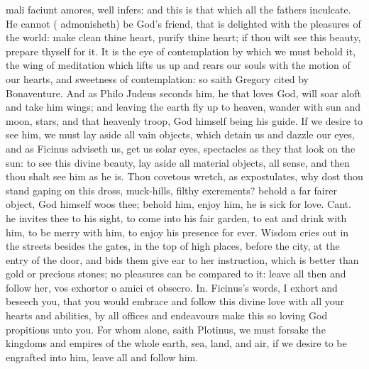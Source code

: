 {mali faciunt amores, \Austin{} well infers: and this is that which all the
fathers inculcate. He cannot (\Austin{} admonisheth) be God's
friend, that is delighted with the pleasures of the world: make clean
thine heart, purify thine heart; if thou wilt see this beauty, prepare
thyself for it. It is the eye of contemplation by which we must behold
it, the wing of meditation which lifts us up and rears our souls with
the motion of our hearts, and sweetness of contemplation: so saith
Gregory cited by Bonaventure. And as Philo Judeus seconds
him, he that loves God, will soar aloft and take him wings; and leaving
the earth fly up to heaven, wander with sun and moon, stars, and that
heavenly troop, God himself being his guide. If we desire to see him,
we must lay aside all vain objects, which detain us and dazzle our
eyes, and as Ficinus adviseth us, get us solar eyes, spectacles
as they that look on the sun: to see this divine beauty, lay aside all
material objects, all sense, and then thou shalt see him as he is. Thou
covetous wretch, as \Austin{} expostulates, why dost thou stand
gaping on this dross, muck-hills, filthy excrements? behold a far
fairer object, God himself woos thee; behold him, enjoy him, he is sick
for love. Cant.  he invites thee to his sight, to come into his fair
garden, to eat and drink with him, to be merry with him, to enjoy his
presence for ever. Wisdom cries out in the streets besides the
gates, in the top of high places, before the city, at the entry of the
door, and bids them give ear to her instruction, which is better than
gold or precious stones; no pleasures can be compared to it: leave all
then and follow her, vos exhortor o amici et obsecro. In.
Ficinus's words, I exhort and beseech you, that you would embrace
and follow this divine love with all your hearts and abilities, by all
offices and endeavours make this so loving God propitious unto you. For
whom alone, saith Plotinus, we must forsake the kingdoms and
empires of the whole earth, sea, land, and air, if we desire to be
engrafted into him, leave all and follow him.

}
